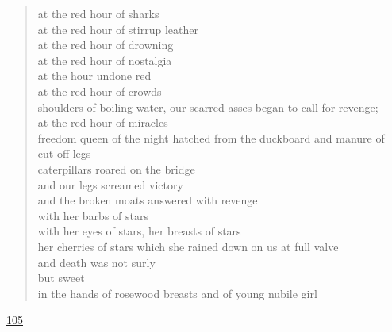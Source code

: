 \documentclass[letterpaper,article,12pt,oneside,notitlepage]{memoir}
\begin{document}
\begin{verse}
at the red hour of sharks \\
at the red hour of stirrup leather \\
at the red hour of drowning \\
at the red hour of nostalgia \\
at the hour undone red \\
at the red hour of crowds \\
shoulders of boiling water, our scarred asses began to call for revenge; \\
at the red hour of miracles \\
freedom queen of the night hatched from the duckboard and manure of cut-off legs \\
caterpillars roared on the bridge \\
and our legs screamed victory \\
and the broken moats answered with revenge \\
with her barbs of stars \\
with her eyes of stars, her breasts of stars \\
her cherries of stars which she rained down on us at full valve \\
and death was not surly \\
but sweet \\
in the hands of rosewood breasts and of young nubile girl \\
\end{verse}

\clearpage

\href{http://cesaire.elotroalex.com/chiens/chiens/p105.html}{105}
\end{document}
